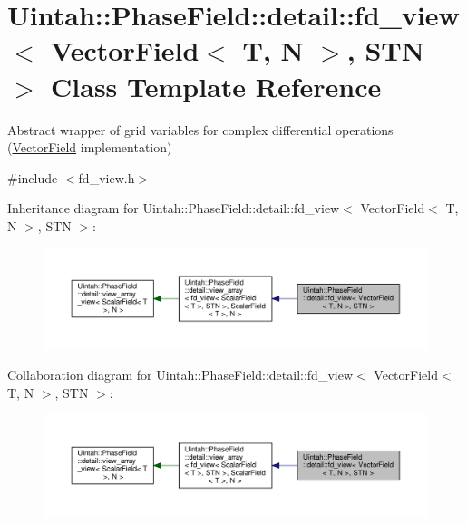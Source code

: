\hypertarget{classUintah_1_1PhaseField_1_1detail_1_1fd__view_3_01VectorField_3_01T_00_01N_01_4_00_01STN_01_4}{}\section{Uintah\+:\+:Phase\+Field\+:\+:detail\+:\+:fd\+\_\+view$<$ Vector\+Field$<$ T, N $>$, S\+TN $>$ Class Template Reference}
\label{classUintah_1_1PhaseField_1_1detail_1_1fd__view_3_01VectorField_3_01T_00_01N_01_4_00_01STN_01_4}


Abstract wrapper of grid variables for complex differential operations (\hyperlink{structUintah_1_1PhaseField_1_1VectorField}{Vector\+Field} implementation)  




{\ttfamily \#include $<$fd\+\_\+view.\+h$>$}



Inheritance diagram for Uintah\+:\+:Phase\+Field\+:\+:detail\+:\+:fd\+\_\+view$<$ Vector\+Field$<$ T, N $>$, S\+TN $>$\+:\nopagebreak
\begin{figure}[H]
\begin{center}
\leavevmode
\includegraphics[width=350pt]{classUintah_1_1PhaseField_1_1detail_1_1fd__view_3_01VectorField_3_01T_00_01N_01_4_00_01STN_01_4__inherit__graph}
\end{center}
\end{figure}


Collaboration diagram for Uintah\+:\+:Phase\+Field\+:\+:detail\+:\+:fd\+\_\+view$<$ Vector\+Field$<$ T, N $>$, S\+TN $>$\+:\nopagebreak
\begin{figure}[H]
\begin{center}
\leavevmode
\includegraphics[width=350pt]{classUintah_1_1PhaseField_1_1detail_1_1fd__view_3_01VectorField_3_01T_00_01N_01_4_00_01STN_01_4__coll__graph}
\end{center}
\end{figure}
